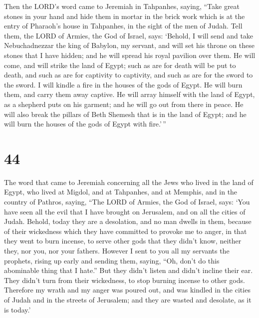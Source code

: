  Then the LORD's word came to Jeremiah in Tahpanhes, saying,
 ``Take great stones in your hand and hide them in mortar in
the brick work which is at the entry of Pharaoh's house in Tahpanhes, in
the sight of the men of Judah.  Tell them, the LORD of
Armies, the God of Israel, says: `Behold, I will send and take
Nebuchadnezzar the king of Babylon, my servant, and will set his throne
on these stones that I have hidden; and he will spread his royal
pavilion over them.  He will come, and will strike the land
of Egypt; such as are for death will be put to death, and such as are
for captivity to captivity, and such as are for the sword to the sword.
 I will kindle a fire in the houses of the gods of Egypt.
He will burn them, and carry them away captive. He will array himself
with the land of Egypt, as a shepherd puts on his garment; and he will
go out from there in peace.  He will also break the pillars
of Beth Shemesh that is in the land of Egypt; and he will burn the
houses of the gods of Egypt with fire.'\,''

\hypertarget{section-43}{%
\section{44}\label{section-43}}

 The word that came to Jeremiah concerning all the Jews who
lived in the land of Egypt, who lived at Migdol, and at Tahpanhes, and
at Memphis, and in the country of Pathros, saying,  ``The
LORD of Armies, the God of Israel, says: `You have seen all the evil
that I have brought on Jerusalem, and on all the cities of Judah.
Behold, today they are a desolation, and no man dwells in them,
 because of their wickedness which they have committed to
provoke me to anger, in that they went to burn incense, to serve other
gods that they didn't know, neither they, nor you, nor your fathers.
 However I sent to you all my servants the prophets, rising
up early and sending them, saying, ``Oh, don't do this abominable thing
that I hate.''  But they didn't listen and didn't incline
their ear. They didn't turn from their wickedness, to stop burning
incense to other gods.  Therefore my wrath and my anger was
poured out, and was kindled in the cities of Judah and in the streets of
Jerusalem; and they are wasted and desolate, as it is today.'

